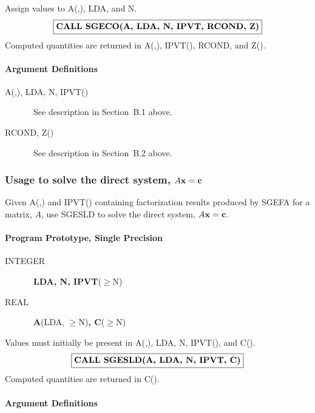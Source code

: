 \documentclass[twoside]{MATH77}
\begin{document}
Assign values to A(,), LDA, and N.
$$
\fbox{\bf CALL SGECO(A, LDA, N, IPVT, RCOND, Z)}
$$
Computed quantities are returned in A(,), IPVT(), RCOND, and Z().

\paragraph{Argument Definitions}

\begin{description}
\item[A(,), LDA, N, IPVT()] \ See description in Section~B.1 above.

\item[RCOND, Z()] \ See description in Section~B.2 above.
\end{description}

\subsubsection{Usage to solve the direct system, $A{\bf x} = {\bf c}$}

Given A(,) and IPVT() containing factorization results produced by SGEFA for
a matrix, $A$, use SGESLD to solve the direct system, $A{\bf x} = {\bf c}.$

\paragraph{Program Prototype, Single Precision}

\begin{description}

\item[INTEGER] \ {\bf LDA, N, IPVT}($\geq $N)

\item[REAL] \ {\bf A}(LDA, $\geq $N){\bf , C}($\geq $N)

\end{description}

Values must initially be present in A(,), LDA, N, IPVT(), and C().
$$
\fbox{\bf CALL SGESLD(A, LDA, N, IPVT, C)}
$$
Computed quantities are returned in C().

\paragraph{Argument Definitions}
\end{document}

